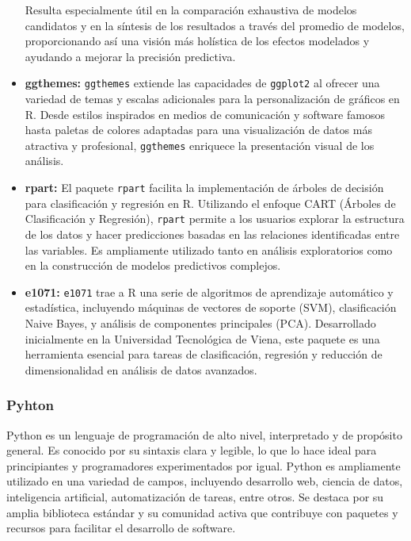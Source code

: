 \documentclass[
  11pt,
  bookmarksnumbered]{article}
\begin{document}
\begin{itemize}
  Resulta especialmente útil en la comparación exhaustiva de modelos candidatos y en la síntesis de los resultados a través del promedio de modelos, proporcionando así una visión más holística de los efectos modelados y ayudando a mejorar la precisión predictiva.
\item
  \textbf{ggthemes:} \texttt{ggthemes} extiende las capacidades de \texttt{ggplot2} al ofrecer una variedad de temas y escalas adicionales para la personalización de gráficos en R.
  Desde estilos inspirados en medios de comunicación y software famosos hasta paletas de colores adaptadas para una visualización de datos más atractiva y profesional, \texttt{ggthemes} enriquece la presentación visual de los análisis.
\item
  \textbf{rpart:} El paquete \texttt{rpart} facilita la implementación de árboles de decisión para clasificación y regresión en R.
  Utilizando el enfoque CART (Árboles de Clasificación y Regresión), \texttt{rpart} permite a los usuarios explorar la estructura de los datos y hacer predicciones basadas en las relaciones identificadas entre las variables.
  Es ampliamente utilizado tanto en análisis exploratorios como en la construcción de modelos predictivos complejos.
\item
  \textbf{e1071:} \texttt{e1071} trae a R una serie de algoritmos de aprendizaje automático y estadística, incluyendo máquinas de vectores de soporte (SVM), clasificación Naive Bayes, y análisis de componentes principales (PCA).
  Desarrollado inicialmente en la Universidad Tecnológica de Viena, este paquete es una herramienta esencial para tareas de clasificación, regresión y reducción de dimensionalidad en análisis de datos avanzados.
\end{itemize}

\hypertarget{pyhton}{%
\subsubsection{Pyhton}\label{pyhton}}

Python es un lenguaje de programación de alto nivel, interpretado y de propósito general.
Es conocido por su sintaxis clara y legible, lo que lo hace ideal para principiantes y programadores experimentados por igual.
Python es ampliamente utilizado en una variedad de campos, incluyendo desarrollo web, ciencia de datos, inteligencia artificial, automatización de tareas, entre otros.
Se destaca por su amplia biblioteca estándar y su comunidad activa que contribuye con paquetes y recursos para facilitar el desarrollo de software.
\textcite{PythonSoftwareFoundation2022}
\end{document}
